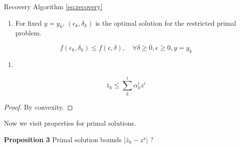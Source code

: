 \begin{theorem} \label{lemma:recovery}  Recovery Algorithm \eqref{eq:recovery}
  \begin{enumerate}
    \def\labelenumi{(\alph{enumi})}
    \tightlist
    \item
          For fixed \(y=y_k\), \((\epsilon_k, \delta_k)\) is the optimal
          solution for the restricted primal problem.
  \end{enumerate}

  \[f(\epsilon_k, \delta_k) \le f(\epsilon, \delta), \quad \forall \delta\ge 0, \epsilon\ge 0, y= y_k\]

  \begin{enumerate}
    \def\labelenumi{(\alph{enumi})}
    \setcounter{enumi}{1}
    \tightlist
    \item
  \end{enumerate}

  \[\bar z_k \le \sum^i_k \alpha^i_k z^i\]
\end{theorem}

\begin{proof}
  By convexity.
\end{proof}

Now we visit properties for primal solutions.

\textbf{Proposition 3} Primal solution bounds \(|\bar z_k - z^\star|\) ?

